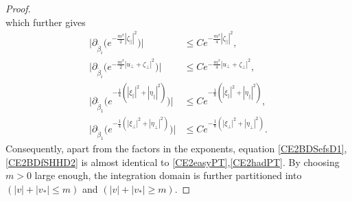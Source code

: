 \documentclass[10pt,a4paper]{amsart}
\begin{document}
\begin{proof}
\begin{equation*}
		\end{equation*}
		which further gives
		\begin{align*}
			\big|\partial_{\tilde{\beta}_i}\big(e^{-\frac{m^\beta}{2}|\zeta_{\parallel}|^2}\big)\big|&\leq C e^{-\frac{m^\beta}{4}|\zeta_{\parallel}|^2},\\
			\big|\partial_{\tilde{\beta}_i}\big(e^{-\frac{m^\beta}{2}|u_{\perp} + \zeta_{\perp}|^2}\big)\big|&\leq C e^{-\frac{m^\beta}{4}|u_{\perp} + \zeta_{\perp}|^2},\\
			\big|\partial_{\tilde{\beta}_1}\big(e^{-\frac{1}{4}(|\xi_{\parallel}|^2+|\eta_{\parallel}|^2)}\big)\big|&\leq C e^{-\frac{1}{8}(|\xi_{\parallel}|^2+|\eta_{\parallel}|^2)},\\
			\big|\partial_{\tilde{\beta}_1}\big(e^{-\frac{1}{4}(|\xi_{\perp}|^2+|\eta_{\perp}|^2) }\big)\big|&\leq C e^{-\frac{1}{8}(|\xi_{\perp}|^2+|\eta_{\perp}|^2) }.
		\end{align*}
		Consequently, apart from the factors in the exponents, equation \eqref{CE2BDSefsD1},\eqref{CE2BDfSHHD2} is almost identical to \eqref{CE2easyPT},\eqref{CE2hadPT}. By choosing $m>0$ large enough, the integration domain is further partitioned into $(|v|+|v_*| \leq m)$ and $(|v|+|v_*| \geq m)$. 
		

\end{proof}
\end{document}
